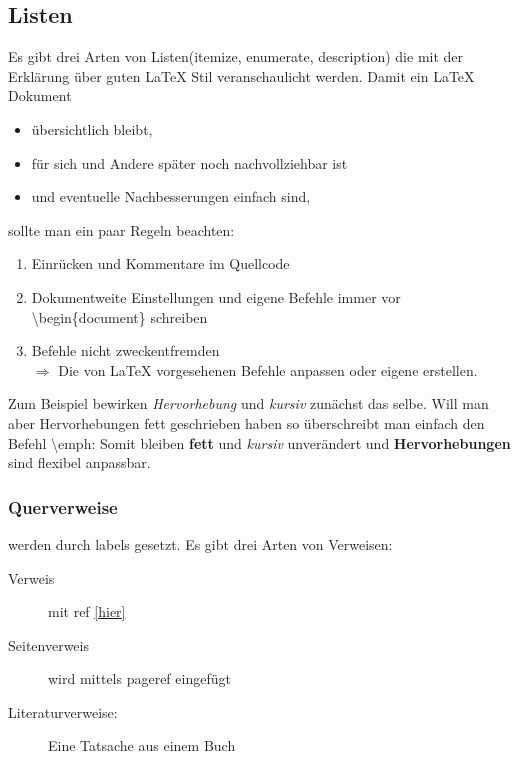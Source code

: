 	\subsection{Listen}
	Es gibt drei Arten von Listen(itemize, enumerate, description) die mit der Erklärung über guten LaTeX Stil veranschaulicht werden.
	Damit ein LaTeX Dokument	%
	\begin{itemize}\itemsep-2pt
		\item übersichtlich bleibt,
		\item für sich und Andere später noch nachvollziehbar ist
		\item und eventuelle Nachbesserungen einfach sind,
	\end{itemize}
	sollte man ein paar Regeln beachten:
	\begin{enumerate}
		\item Einrücken und Kommentare im Quellcode
		\item Dokumentweite Einstellungen und eigene Befehle immer vor \textbackslash begin\{document\} schreiben
		\item Befehle nicht zweckentfremden\\
			$\Rightarrow$ Die von LaTeX vorgesehenen Befehle anpassen oder eigene erstellen.			%
	\end{enumerate}

	Zum Beispiel bewirken \emph{Hervorhebung} und \textit{kursiv} zunächst das selbe.
	Will man aber Hervorhebungen fett geschrieben haben so überschreibt man einfach den Befehl \textbackslash emph:
	\renewcommand{\emph}[1]{\textbf{#1}}	%
	Somit bleiben \textbf{fett} und \textit{kursiv} unverändert und \emph{Hervorhebungen} sind flexibel anpassbar.\\
	\subsubsection{Querverweise} werden durch labels gesetzt.\label{hier} Es gibt drei Arten von Verweisen:
	\begin{description}
		\item[Verweis] mit ref \ref{hier}
		\item[Seitenverweis] wird mittels pageref \pageref{hier} eingefügt
		\item[Literaturverweise:] Eine Tatsache aus einem Buch \cite{bowie}
	\end{description}


